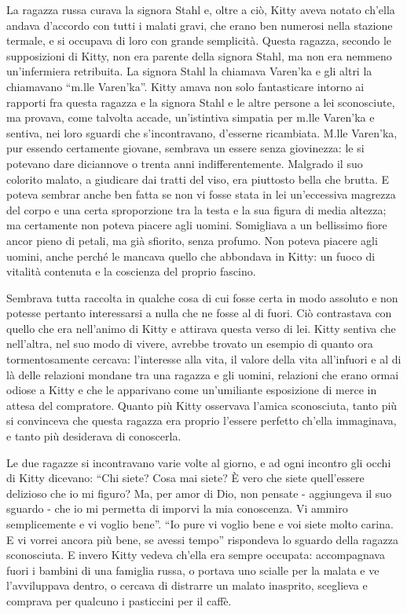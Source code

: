 La ragazza russa curava la signora Stahl e, oltre a ciò, Kitty aveva notato ch'ella andava d'accordo con tutti i malati gravi, che erano ben numerosi nella stazione termale, e si occupava di loro con grande semplicità. Questa ragazza, secondo le supposizioni di Kitty, non era parente della signora Stahl, ma non era nemmeno un'infermiera retribuita. La signora Stahl la chiamava Varen'ka e gli altri la chiamavano ``m.lle Varen'ka''. Kitty amava non solo fantasticare intorno ai rapporti fra questa ragazza e la signora Stahl e le altre persone a lei sconosciute, ma provava, come talvolta accade, un'istintiva simpatia per m.lle Varen'ka e sentiva, nei loro sguardi che s'incontravano, d'esserne ricambiata. M.lle Varen'ka, pur essendo certamente giovane, sembrava un essere senza giovinezza: le si potevano dare diciannove o trenta anni indifferentemente. Malgrado il suo colorito malato, a giudicare dai tratti del viso, era piuttosto bella che brutta. E poteva sembrar anche ben fatta se non vi fosse stata in lei un'eccessiva magrezza del corpo e una certa sproporzione tra la testa e la sua figura di media altezza; ma certamente non poteva piacere agli uomini. Somigliava a un bellissimo fiore ancor pieno di petali, ma già sfiorito, senza profumo. Non poteva piacere agli uomini, anche perché le mancava quello che abbondava in Kitty: un fuoco di vitalità contenuta e la coscienza del proprio fascino. 

Sembrava tutta raccolta in qualche cosa di cui fosse certa in modo assoluto e non potesse pertanto interessarsi a nulla che ne fosse al di fuori. Ciò contrastava con quello che era nell'animo di Kitty e attirava questa verso di lei. Kitty sentiva che nell'altra, nel suo modo di vivere, avrebbe trovato un esempio di quanto ora tormentosamente cercava: l'interesse alla vita, il valore della vita all'infuori e al di là delle relazioni mondane tra una ragazza e gli uomini, relazioni che erano ormai odiose a Kitty e che le apparivano come un'umiliante esposizione di merce in attesa del compratore. Quanto più Kitty osservava l'amica sconosciuta, tanto più si convinceva che questa ragazza era proprio l'essere perfetto ch'ella immaginava, e tanto più desiderava di conoscerla. 

Le due ragazze si incontravano varie volte al giorno, e ad ogni incontro gli occhi di Kitty dicevano: ``Chi siete? Cosa mai siete? È vero che siete quell'essere delizioso che io mi figuro? Ma, per amor di Dio, non pensate - aggiungeva il suo sguardo - che io mi permetta di imporvi la mia conoscenza. Vi ammiro semplicemente e vi voglio bene''. ``Io pure vi voglio bene e voi siete molto carina. E vi vorrei ancora più bene, se avessi tempo'' rispondeva lo sguardo della ragazza sconosciuta. E invero Kitty vedeva ch'ella era sempre occupata: accompagnava fuori i bambini di una famiglia russa, o portava uno scialle per la malata e ve l'avviluppava dentro, o cercava di distrarre un malato inasprito, sceglieva e comprava per qualcuno i pasticcini per il caffè. 

